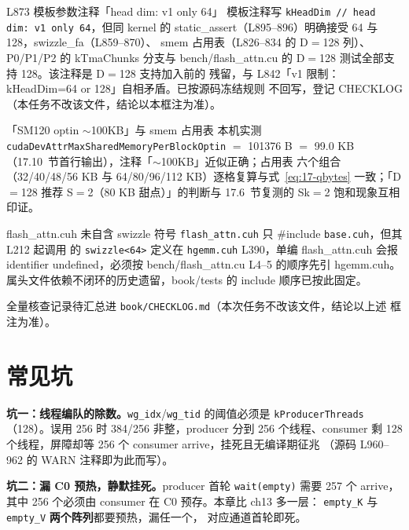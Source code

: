 \begin{kaogu}[F1·注释过时]{L873 模板参数注释「head dim: v1 only 64」}
  模板注释写 \texttt{kHeadDim // head dim: v1 only 64}，但同 kernel 的
  static\_assert（L895--896）明确接受 64 与 128，swizzle\_fa（L859--870）、
  smem 占用表（L826--834 的 D$=$128 列）、P0/P1/P2 的 kTmaChunks 分支与
  bench/flash\_attn.cu 的 D$=$128 测试全部支持 128。该注释是 D$=$128 支持加入前的
  残留，与 L842「v1 限制：kHeadDim=64 or 128」自相矛盾。已按源码冻结规则
  不回写，登记 CHECKLOG（本任务不改该文件，结论以本框注为准）。
\end{kaogu}

\begin{kaogu}[F1 核校通过]{「SM120 optin $\sim$100KB」与 smem 占用表}
  本机实测 \texttt{cuda\allowbreak{}Dev\allowbreak{}Attr\allowbreak{}Max\allowbreak{}Shared\allowbreak{}Memory\allowbreak{}Per\allowbreak{}Block\allowbreak{}Optin} $=$ 101376 B
  $=$ 99.0 KB（17.10~节首行输出），注释「$\sim$100KB」近似正确；占用表
  六个组合（32/40/48/56 KB 与 64/80/96/112 KB）逐格复算与式~\ref{eq:17-qbytes}
  一致；「D$=$128 推荐 S$=$2（80 KB 甜点）」的判断与 17.6~节复测的
  Sk$=$2 饱和现象互相印证。
\end{kaogu}

\begin{kaogu}[F5·依赖关系考据]{flash\_attn.cuh 未自含 swizzle 符号}
  \texttt{flash\_\allowbreak{}attn.\allowbreak{}cuh} 只 \#include \texttt{base.cuh}，但其 L212 起调用
  的 \texttt{swizzle<64>} 定义在 \texttt{hgemm.cuh} L390，单编 flash\_attn.cuh
  会报 identifier undefined，必须按 bench/flash\_attn.cu L4--5 的顺序先引 hgemm.cuh。
  属头文件依赖不闭环的历史遗留，book/tests 的 include 顺序已按此固定。
\end{kaogu}

全量核查记录待汇总进 \texttt{book/\allowbreak{}CHECKLOG.\allowbreak{}md}（本次任务不改该文件，结论以上述
框注为准）。

\section{常见坑}

\textbf{坑一：线程编队的除数。}\texttt{wg\_idx}/\texttt{wg\_tid} 的阈值必须是
\texttt{k\allowbreak{}Producer\allowbreak{}Threads}（128）。误用 256 时 384/256 非整，producer 分到 256
个线程、consumer 剩 128 个线程，屏障却等 256 个 consumer arrive，挂死且无编译期征兆
（源码 L960--962 的 WARN 注释即为此而写）。

\textbf{坑二：漏 C0 预热，静默挂死。}\allowbreak{}producer 首轮 \texttt{wait(empty)} 需要
257 个 arrive，其中 256 个必须由 consumer 在 C0 预存。本章比 ch13 多一层：
\texttt{empty\_K} 与 \texttt{empty\_V} \textbf{两个阵列}都要预热，漏任一个，
对应通道首轮即死。

